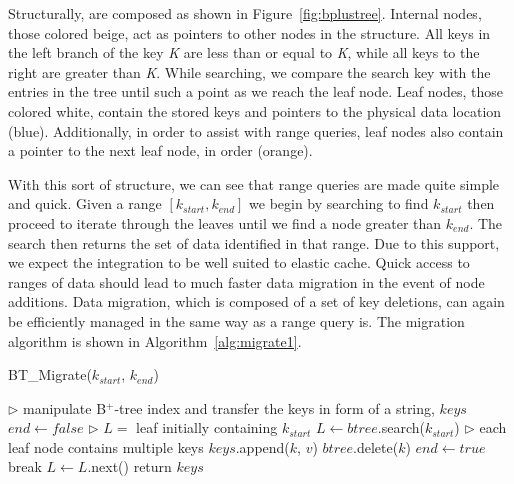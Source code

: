 Structurally, \bptrees are composed as shown in Figure~\ref{fig:bplustree}.
Internal nodes, those colored beige, act as pointers to other nodes in the
structure. All keys in the left branch of the key \emph{K} are less than or
equal to \emph{K}, while all keys to the right are greater than \emph{K}. While
searching, we compare the search key with the entries in the tree until such a
point as we reach the leaf node. Leaf nodes, those colored white, contain the
stored keys and pointers to the physical data location (blue). Additionally, in
order to assist with range queries, leaf nodes also contain a pointer to the
next leaf node, in order (orange).

With this sort of structure, we can see that range queries are made quite
simple and quick. Given a range $[k_{start}, k_{end}]$ we begin by searching to
find $k_{start}$ then proceed to iterate through the leaves until we find a
node greater than $k_{end}$. The search then returns the set of data identified
in that range. Due to this support, we expect the \bptree integration to be
well suited to elastic cache. Quick access to ranges of data should lead to
much faster data migration in the event of node additions. Data migration,
which is composed of a set of key deletions, can again be efficiently managed
in the same way as a range query is. The \bptree migration algorithm is shown
in Algorithm~\ref{alg:migrate1}.

\begin{algorithm}[htp]
\small
\caption{\label{alg:migrate1}BT\_Migrate($k_{start}$, $k_{end}$)} \begin{algorithmic}[1]
\STATE $\triangleright$ manipulate B$^+$-tree index and transfer the keys in form of a string, $keys$
\STATE $end \leftarrow false$
\STATE $\triangleright$ $L =$ leaf initially containing $k_{start}$ 
\STATE $L \leftarrow btree$.search($k_{start}$)
 \STATE $\triangleright$ each leaf node contains multiple keys
     \STATE $keys$.append($k$, $v$)
     \STATE $btree$.delete($k$)
   \ELSE
     \STATE $end \leftarrow true$
     \STATE break
   \ENDIF
 \ENDFOR
 \STATE $L \leftarrow L$.next()
\ENDWHILE
\STATE return $keys$
\end{algorithmic}
\end{algorithm}



